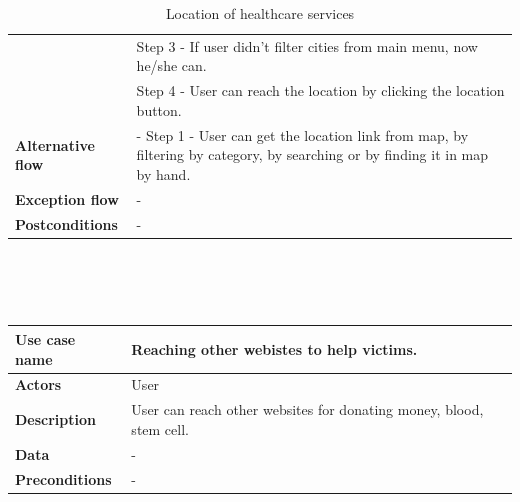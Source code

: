 \begin{center}
\begin{table}[H]
\begin{tabular}{| m{3cm}| m{10cm} |}
                                      & Step 3 - If user didn't filter cities from main menu, now he/she can.                                                                                                \\
                                      & Step 4 - User can reach the location by clicking the location button.                                                                                                \\
            \hline
            \textbf{Alternative flow} & - Step 1 - User can get the location link from map, by filtering by category, by searching or by finding it in map by hand.                                          \\
            \hline
            \textbf{Exception flow}   & -                                                                                                                                                                    \\
            \hline
            \textbf{Postconditions}   & -                                                                                                                                                                    \\
            \hline
        \end{tabular}
        \caption[Location of healthcare services]{Location of healthcare services}
    \end{table}
    ~\\~\\~\\
    \begin{table}[H]
        \begin{tabular}{| m{3cm}| m{10cm} |}
            \hline
            \textbf{Use case name}    & Reaching other webistes to help victims.                             \\
            \hline
            \textbf{Actors}           & User                                                                 \\
            \hline
            \textbf{Description}      & User can reach other websites for donating money, blood, stem cell.  \\
            \hline
            \textbf{Data}             & -                                                                    \\
            \hline
            \textbf{Preconditions}    & -                                                                    \\

\end{tabular}
\end{table}
\end{center}
